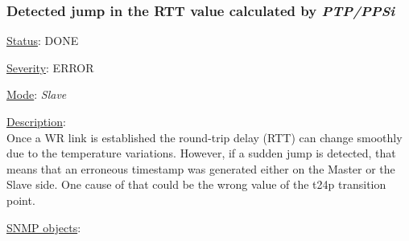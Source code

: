 \subsubsection{\bf Detected jump in the RTT value calculated by \emph{PTP/PPSi}}
		\label{fail:timing:rtt_jump}
		\begin{pck_descr}
			\item [] \underline{Status}: DONE
			\item [] \underline{Severity}: ERROR
			\item [] \underline{Mode}: \emph{Slave}
			\item [] \underline{Description}:\\
				Once a WR link is established the round-trip delay (RTT) can change
        smoothly due to the temperature variations. However, if a sudden jump is
        detected, that means that an erroneous timestamp was generated either on
        the Master or the Slave side.
				One cause of that could be the wrong value of the t24p transition point.
			\item [] \underline{SNMP objects}:\\
        {\footnotesize
				\\
				\\
				\\
				 \\
         }
		\end{pck_descr}


